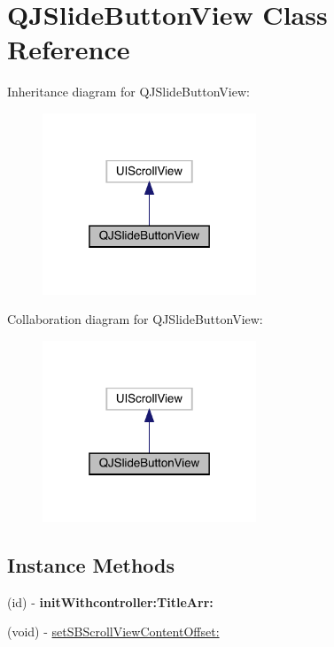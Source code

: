 \hypertarget{interface_q_j_slide_button_view}{}\section{Q\+J\+Slide\+Button\+View Class Reference}
\label{interface_q_j_slide_button_view}


Inheritance diagram for Q\+J\+Slide\+Button\+View\+:\nopagebreak
\begin{figure}[H]
\begin{center}
\leavevmode
\includegraphics[width=181pt]{interface_q_j_slide_button_view__inherit__graph}
\end{center}
\end{figure}


Collaboration diagram for Q\+J\+Slide\+Button\+View\+:\nopagebreak
\begin{figure}[H]
\begin{center}
\leavevmode
\includegraphics[width=181pt]{interface_q_j_slide_button_view__coll__graph}
\end{center}
\end{figure}
\subsection*{Instance Methods}
\begin{DoxyCompactItemize}
\item 
\mbox{\label{interface_q_j_slide_button_view_ad6fecea6f8660002a3007ae01b26ab01}} 
(id) -\/ {\bfseries init\+Withcontroller\+:\+Title\+Arr\+:}
\item 
(void) -\/ \mbox{\hyperlink{interface_q_j_slide_button_view_a2c3623f6d0f09fbf232c5196540e0726}{set\+S\+B\+Scroll\+View\+Content\+Offset\+:}}
\end{DoxyCompactItemize}
